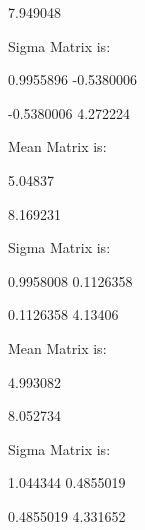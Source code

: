 \documentclass[11pt]{article}
\begin{document}
7.949048 
\

Sigma Matrix is: \

0.9955896 -0.5380006 \

-0.5380006 4.272224 \


Mean Matrix is: \

5.04837 \

8.169231 \


Sigma Matrix is: \

0.9958008 0.1126358 \

0.1126358 4.13406 \


Mean Matrix is: \

4.993082\
 
8.052734 \


Sigma Matrix is: \

1.044344 0.4855019\
 
0.4855019 4.331652 \
\newpage
\end{document}
